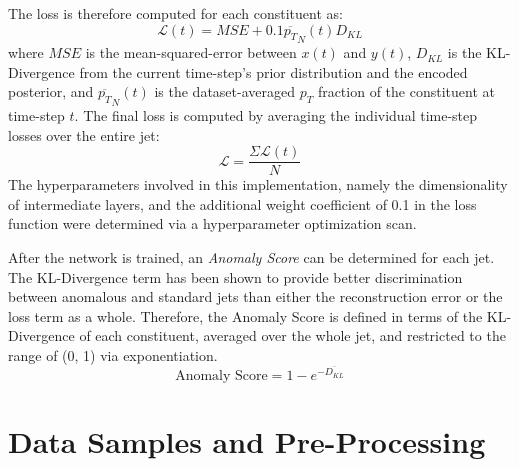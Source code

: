 \documentclass[12pt, a4paper]{article}
\begin{document}
The loss is therefore computed for each constituent as:
\begin{equation}
\mathcal{L}(t)=MSE+0.1\overline{p_{T}}_{N}(t)D_{KL}
\end{equation}
where $MSE$ is the mean-squared-error between $x(t)$ and $y(t)$, $D_{KL}$ is the KL-Divergence from the current time-step's prior distribution and the encoded posterior, and $\overline{p_T}_{N}(t)$ is the dataset-averaged $p_T$ fraction of the constituent at time-step $t$. The final loss is computed by averaging the individual time-step losses over the entire jet: 
\begin{equation}
\mathcal{L} = \frac{\Sigma \mathcal{L}(t)}{N} 
\end{equation} 
The hyperparameters involved in this implementation, namely the dimensionality of intermediate layers, and the additional weight coefficient of 0.1 in the loss function were determined via a hyperparameter optimization scan. 

After the network is trained, an \textit{Anomaly Score} can be determined for each jet. The KL-Divergence term has been shown to provide better discrimination between anomalous and standard jets than either the reconstruction error or the loss term as a whole. Therefore, the Anomaly Score is defined in terms of the KL-Divergence of each constituent, averaged over the whole jet, and restricted to the range of (0, 1) via exponentiation. 
\begin{equation}
	\text{Anomaly Score} = 1 - e^{-\overline{D_{KL}}}
\end{equation}




\section{Data Samples and Pre-Processing}
\end{document}
